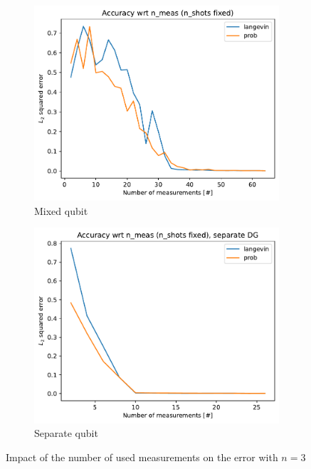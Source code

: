 \documentclass[12pt]{memoir}
\begin{document}
\begin{figure}[H]
    \centering
    \begin{subfigure}[b]{0.49\textwidth}
        \centering
        \includegraphics[width=\textwidth]{figures/experiments/meas/meas_acc_comp_meas-1.png}
        \caption{Mixed qubit}
        \label{fig:meas-comp-mixed-sub}
    \end{subfigure}
    \hfill
    \begin{subfigure}[b]{0.49\textwidth}
        \centering
        \includegraphics[width=\textwidth]{figures/experiments/meas/meas_acc_comp_meas_sep-1.png}
        \caption{Separate qubit}
        \label{fig:meas-comp-sep-sub}
    \end{subfigure}
    \caption{Impact of the number of used measurements on the error with $n=3$}
    \label{fig:meas-comp}
\end{figure}\medbreak
\end{document}
